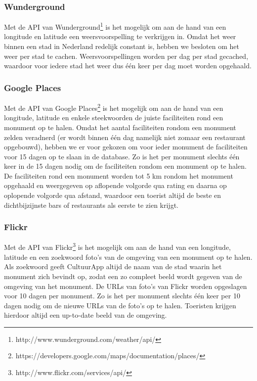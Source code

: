 \documentclass[a4paper,10pt]{article}
\begin{document}
		\subsubsection{Wunderground}
		Met de API van Wunderground\footnote{http://www.wunderground.com/weather/api/} is het mogelijk om aan de hand van een longitude en latitude een weersvoorspelling te verkrijgen in. Omdat het weer binnen een stad in Nederland redelijk constant is, hebben we besloten om het weer per stad te cachen. Weersvoorspellingen worden per dag per stad gecached, waardoor voor iedere stad het weer dus \'e\'en keer per dag moet worden opgehaald.
	
		\subsubsection{Google Places}
		Met de API van Google Places\footnote{https://developers.google.com/maps/documentation/places/} is het mogelijk om aan de hand van een longitude, latitude en enkele steekwoorden de juiste faciliteiten rond een monument op te halen. Omdat het aantal faciliteiten rondom een monument zelden veradnerd (er wordt binnen \'e\'en dag namelijk niet zomaar een restaurant opgebouwd), hebben we er voor gekozen om voor ieder monument de faciliteiten voor 15 dagen op te slaan in de database. Zo is het per monument slechts \'e\'en keer in de 15 dagen nodig om de faciliteiten rondom een monument op te halen. De faciliteiten rond een monument worden tot 5 km rondom het monument opgehaald en weergegeven op aflopende volgorde qua rating en daarna op oplopende volgorde qua afstand, waardoor een toerist altijd de beste en dichtbijzijnste bars of restaurants als eerste te zien krijgt.
	
		\subsubsection{Flickr}
		Met de API van Flickr\footnote{http://www.flickr.com/services/api/} is het mogelijk om aan de hand van een longitude, latitude en een zoekwoord foto's van de omgeving van een monument op te halen. Als zoekwoord geeft CultuurApp altijd de naam van de stad waarin het monument zich bevindt op, zodat een zo compleet beeld wordt gegeven van de omgeving van het monument. De URLs van foto's van Flickr worden opgeslagen voor 10 dagen per monument. Zo is het per monument slechts \'e\'en keer per 10 dagen nodig om de nieuwe URLs van de foto's op te halen. Toeristen krijgen hierdoor altijd een up-to-date beeld van de omgeving.
		
\end{document}
